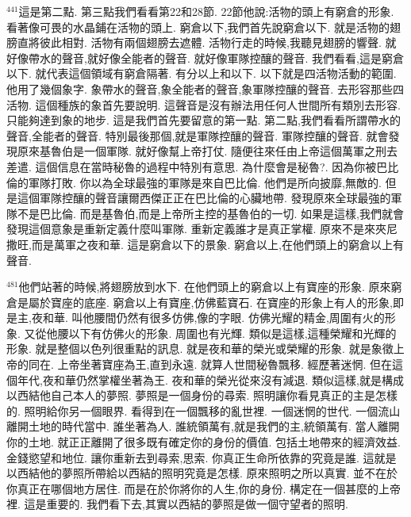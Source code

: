 \documentclass{book}
\begin{document}
$^{441}$這是第二點.
第三點我們看看第22和28節.
22節他說:活物的頭上有窮倉的形象.
看著像可畏的水晶鋪在活物的頭上.
窮倉以下,我們首先說窮倉以下.
就是活物的翅膀直將彼此相對.
活物有兩個翅膀去遮體.
活物行走的時候,我聽見翅膀的響聲.
就好像帶水的聲音,就好像全能者的聲音.
就好像軍隊控釀的聲音.
我們看看,這是窮倉以下.
就代表這個領域有窮倉隔著.
有分以上和以下.
以下就是四活物活動的範圍.
他用了幾個象字.
象帶水的聲音,象全能者的聲音,象軍隊控釀的聲音.
去形容那些四活物.
這個種族的象首先要說明.
這聲音是沒有辦法用任何人世間所有類別去形容.
只能夠達到象的地步.
這是我們首先要留意的第一點.
第二點,我們看看所謂帶水的聲音,全能者的聲音.
特別最後那個,就是軍隊控釀的聲音.
軍隊控釀的聲音.
就會發現原來基魯伯是一個軍隊.
就好像幫上帝打仗.
隨便往來任由上帝這個萬軍之刑去差遣.
這個信息在當時秘魯的過程中特別有意思.
為什麼會是秘魯?.
因為你被巴比倫的軍隊打敗.
你以為全球最強的軍隊是來自巴比倫.
他們是所向披靡,無敵的.
但是這個軍隊控釀的聲音讓爾西傑正正在巴比倫的心臟地帶.
發現原來全球最強的軍隊不是巴比倫.
而是基魯伯,而是上帝所主控的基魯伯的一切.
如果是這樣,我們就會發現這個意象是重新定義什麼叫軍隊.
重新定義誰才是真正掌權.
原來不是來夾尼撒旺,而是萬軍之夜和華.
這是窮倉以下的景象.
窮倉以上,在他們頭上的窮倉以上有聲音.

$^{481}$他們站著的時候,將翅膀放到水下.
在他們頭上的窮倉以上有寶座的形象.
原來窮倉是屬於寶座的底座.
窮倉以上有寶座,仿佛藍寶石.
在寶座的形象上有人的形象,即是主,夜和華.
叫他腰間仍然有很多仿佛,像的字眼.
仿佛光耀的精金,周圍有火的形象.
又從他腰以下有仿佛火的形象.
周圍也有光輝.
類似是這樣,這種榮耀和光輝的形象.
就是整個以色列很重點的訊息.
就是夜和華的榮光或榮耀的形象.
就是象徵上帝的同在.
上帝坐著寶座為王,直到永遠.
就算人世間秘魯飄移.
經歷著迷惘.
但在這個年代,夜和華仍然掌權坐著為王.
夜和華的榮光從來沒有減退.
類似這樣,就是構成以西結他自己本人的夢照.
夢照是一個身份的尋索.
照明讓你看見真正的主是怎樣的.
照明給你另一個眼界.
看得到在一個飄移的亂世裡.
一個迷惘的世代.
一個流山離開土地的時代當中.
誰坐著為人.
誰統領萬有,就是我們的主,統領萬有.
當人離開你的土地.
就正正離開了很多既有確定你的身份的價值.
包括土地帶來的經濟效益.
金錢慾望和地位.
讓你重新去到尋索,思索.
你真正生命所依靠的究竟是誰.
這就是以西結他的夢照所帶給以西結的照明究竟是怎樣.
原來照明之所以真實.
並不在於你真正在哪個地方居住.
而是在於你將你的人生,你的身份.
構定在一個甚麼的上帝裡.
這是重要的.
我們看下去,其實以西結的夢照是做一個守望者的照明.
\end{document}
